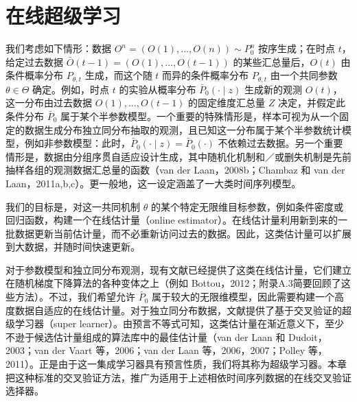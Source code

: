 \begingroup
\chapter{在线超级学习}

我们考虑如下情形：数据 $O^n=(O(1),\ldots,O(n))\sim P_0^n$ 按序生成；在时点 $t$，给定过去数据 $\bar O(t-1)=(O(1),\ldots,O(t-1))$ 的某些汇总量后，$O(t)$ 由条件概率分布 $P_{\theta,t}$ 生成，而这个随 $t$ 而异的条件概率分布 $P_{\theta,t}$ 由一个共同参数 $\theta\in\Theta$ 确定。例如，时点 $t$ 的实验从概率分布 $\bar P_0(\cdot\mid z)$ 生成新的观测 $O(t)$，这一分布由过去数据 $O(1),\ldots,O(t-1)$ 的固定维度汇总量 $Z$ 决定，并假定此条件分布 $\bar P_0$ 属于某个半参数模型。一个重要的特殊情形是，样本可视为从一个固定的数据生成分布独立同分布抽取的观测，且已知这一分布属于某个半参数统计模型，例如非参数模型：此时，$\bar P_0(\cdot\mid z)=\bar P_0(\cdot)$ 不依赖过去数据。另一个重要情形是，数据由分组序贯自适应设计生成，其中随机化机制和／或删失机制是先前抽样各组的观测数据汇总量的函数（van der Laan，2008b；Chambaz 和 van der Laan，2011a,b,c）。更一般地，这一设定涵盖了一大类时间序列模型。

\begin{sourcebox}
我们的目标是，对这一共同机制 $\theta$ 的某个特定无限维目标参数，例如条件密度或回归函数，构建一个在线估计量（online estimator）。在线估计量利用新到来的一批数据更新当前估计量，而不必重新访问过去的数据。因此，这类估计量可以扩展到大数据，并随时间快速更新。
\end{sourcebox}

对于参数模型和独立同分布观测，现有文献已经提供了这类在线估计量，它们建立在随机梯度下降算法的各种变体之上（例如 Bottou，2012；附录A.3简要回顾了这些方法）。不过，我们希望允许 $\bar P_0$ 属于较大的无限维模型，因此需要构建一个高度数据自适应的在线估计量。对于独立同分布数据，文献提供了基于交叉验证的超级学习器（super learner）。由预言不等式可知，这类估计量在渐近意义下，至少不逊于候选估计量组成的算法库中的最佳估计量（van der Laan 和 Dudoit，2003；van der Vaart 等，2006；van der Laan 等，2006，2007；Polley 等，2011）。正是由于这一集成学习器具有预言性质，我们将其称为超级学习器。本章把这种标准的交叉验证方法，推广为适用于上述相依时间序列数据的在线交叉验证选择器。

